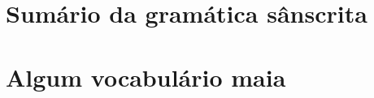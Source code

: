 \documentclass[a4paper]{ifacconf}
\begin{document}


\appendix
\section{Sumário da gramática sânscrita}    %
\section{Algum vocabulário maia}              %
\end{document}
